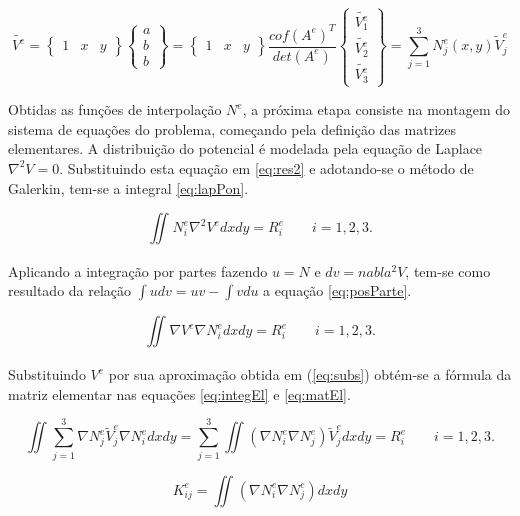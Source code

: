 \documentclass[
    12pt,               %
    openright,          %
    oneside,
    a4paper,            %
    english,            %
    french,             %
    spanish,            %
    brazil              %
    ]{abntex2}
\begin{document}
\begin{equation}
\label{eq:subs}
\tilde{V^e} = 
\begin{Bmatrix}
1 & x & y
\end{Bmatrix}
\begin{Bmatrix}
a \\ b \\ b
\end{Bmatrix}
= \begin{Bmatrix}
1 & x & y
\end{Bmatrix}
\frac{cof(A^e)^T}{det(A^e)}
\begin{Bmatrix}
\tilde{V^e_1}  \\
\tilde{V^e_2} \\
\tilde{V^e_3}
\end{Bmatrix}
=
 \sum_{j=1}^{3}{N_j^e (x, y) \tilde{V}_j^e}
\end{equation}

Obtidas as funções de interpolação $N^e$, a próxima etapa consiste  na montagem do sistema de equações do problema, começando pela definição das matrizes elementares. A distribuição do potencial é modelada pela equação de Laplace $\nabla^2 V = 0$. Substituindo esta equação em \ref{eq:res2} e adotando-se o método de Galerkin, tem-se a integral \ref{eq:lapPon}.

\begin{equation}
\label{eq:lapPon}
\iint_{}{N^e_i \nabla^2 V^e dx dy} = R^e_i \qquad i = 1,2,3.
\end{equation}  

Aplicando a integração por partes fazendo $u = N$ e $dv = nabla^2 V$, tem-se como resultado da relação $\int u dv = uv - \int vdu$ a equação \ref{eq:posParte}.

\begin{equation}
\label{eq:posParte}
\iint_{}{\nabla V^e \nabla N^e_i dx dy} = R^e_i \qquad i = 1,2,3.
\end{equation} 

Substituindo $V^e$ por sua aproximação obtida em (\ref{eq:subs}) obtém-se a fórmula da matriz elementar nas equações \ref{eq:integEl} e \ref{eq:matEl}.

\begin{equation}
\label{eq:integEl}
\iint_{}{ \sum_{j=1}^{3}{\nabla N_j^e \tilde{V}_j^e} \nabla N^e_i dx dy} 
=
\sum_{j=1}^{3}\iint_{}{\left(\nabla N^e_i \nabla N_j^e \right)  \tilde{V}_j^e dx dy}
= R^e_i \qquad i = 1,2,3.
\end{equation} 

\begin{equation}
\label{eq:matEl}
K^e_{ij} 
= 
\iint_{}{\left(\nabla N^e_i \nabla N_j^e \right)  dx dy}
\end{equation} 
\end{document}
